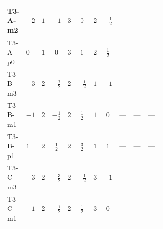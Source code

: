 \documentclass[8pt]{article}
\begin{document}
\begin{landscape}
\begin{longtable}{@{}llcccccc >{\raggedright\arraybackslash}p{0.21\linewidth} >{\raggedright\arraybackslash}p{0.21\linewidth} >{\raggedright\arraybackslash}p{0.21\linewidth}@{}}
\midrule
T3-A-m2 & $-2$ & $1$ & $-1$ & $3$ & $0$ & $2$ & $-\frac{1}{2}$ & \scriptsize\adjustbox{max width=\linewidth}{$\begin{gathered} {\lambda_5} (2 T_{\nu}^{(1)}+T_{\nu}^{(2)}+6 \operatorname{Tr}\!\left({Y_d}\,\left({Y_d}\right)^{\dagger}\right)+2 \operatorname{Tr}\!\left({Y_e}\,\left({Y_e}\right)^{\dagger}\right)+6 \operatorname{Tr}\!\left({Y_u}\,\left({Y_u}\right)^{\dagger}\right)+4 {\lambda_{HS_2}^{(A)}})\end{gathered}$} & \scriptsize\adjustbox{max width=\linewidth}{$\begin{gathered} -\frac{21 {g_2}^2 {\lambda_5}}{2}\end{gathered}$} & \scriptsize\adjustbox{max width=\linewidth}{$\begin{gathered} -\frac{9 {g_1}^2 {\lambda_5}}{2}\end{gathered}$} \\
\midrule
T3-A-p0 & $0$ & $1$ & $0$ & $3$ & $1$ & $2$ & $\frac{1}{2}$ & \scriptsize\adjustbox{max width=\linewidth}{$\begin{gathered} {\lambda_5} (2 T_{\nu}^{(1)}+T_{\nu}^{(2)}+6 \operatorname{Tr}\!\left({Y_d}\,\left({Y_d}\right)^{\dagger}\right)+2 \operatorname{Tr}\!\left({Y_e}\,\left({Y_e}\right)^{\dagger}\right)+6 \operatorname{Tr}\!\left({Y_u}\,\left({Y_u}\right)^{\dagger}\right)+4 {\lambda_{HS_2}^{(A)}})\end{gathered}$} & \scriptsize\adjustbox{max width=\linewidth}{$\begin{gathered} -\frac{21 {g_2}^2 {\lambda_5}}{2}\end{gathered}$} & \scriptsize\adjustbox{max width=\linewidth}{$\begin{gathered} -\frac{9 {g_1}^2 {\lambda_5}}{2}\end{gathered}$} \\
\midrule
T3-B-m3 & $-3$ & $2$ & $-\frac{3}{2}$ & $2$ & $-\frac{1}{2}$ & $1$ & $-1$ & --- & --- & --- \\
\midrule
T3-B-m1 & $-1$ & $2$ & $-\frac{1}{2}$ & $2$ & $\frac{1}{2}$ & $1$ & $0$ & --- & --- & --- \\
\midrule
T3-B-p1 & $1$ & $2$ & $\frac{1}{2}$ & $2$ & $\frac{3}{2}$ & $1$ & $1$ & --- & --- & --- \\
\midrule
T3-C-m3 & $-3$ & $2$ & $-\frac{3}{2}$ & $2$ & $-\frac{1}{2}$ & $3$ & $-1$ & --- & --- & --- \\
\midrule
T3-C-m1 & $-1$ & $2$ & $-\frac{1}{2}$ & $2$ & $\frac{1}{2}$ & $3$ & $0$ & --- & --- & --- \\
\midrule

\end{longtable}
\end{landscape}
\end{document}
